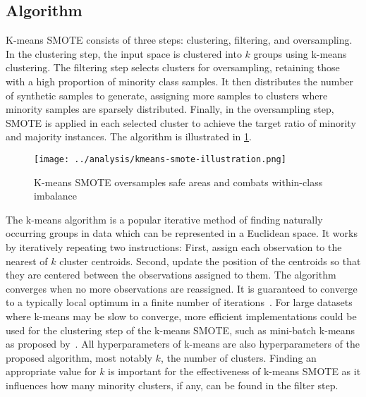 \documentclass[sort&compress]{elsarticle}
\begin{document}
	\subsection{Algorithm}
	K-means \ac{SMOTE} consists of three steps: clustering, filtering, and
	oversampling. In the clustering step, the input space is clustered into $k$
	groups using k-means clustering. The filtering step selects clusters for
	oversampling, retaining those with a high proportion of minority class
	samples. It then distributes the number of synthetic samples to generate,
	assigning more samples to clusters where minority samples are sparsely
	distributed. Finally, in the oversampling step, \ac{SMOTE} is applied in
	each selected cluster to achieve the target ratio of minority and majority
	instances. The algorithm is illustrated in
	\cref{fig:kmeans-smote-illustration}.

    \begin{figure}[ht]
	\centering
	\texttt{[image: ../analysis/kmeans-smote-illustration.png]}
	\caption[K-means \acs{SMOTE} oversamples safe areas and combats within-class imbalance]
	{K-means \ac{SMOTE} oversamples safe areas and combats within-class
	imbalance\protect\footnotemark}
    \label{fig:kmeans-smote-illustration}
	\end{figure}


	The k-means algorithm is a popular iterative method of finding naturally
	occurring groups in data which can be represented in a Euclidean space. It
	works by iteratively repeating two instructions: First, assign each
	observation to the nearest of $k$ cluster centroids. Second, update the
	position of the centroids so that they are centered between the observations
	assigned to them. The algorithm converges when no more observations are
	reassigned. It is guaranteed to converge to a typically local optimum in a
	finite number of iterations~\citep{MacQueen.1967}. For large datasets where
	k-means may be slow to converge, more efficient implementations could be
	used for the clustering step of the k-means \ac{SMOTE}, such as mini-batch
	k-means as proposed by~\citep{Sculley.2010}. All hyperparameters of k-means
	are also hyperparameters of the proposed algorithm, most notably $k$, the
	number of clusters. Finding an appropriate value for $k$ is important for
	the effectiveness of k-means \ac{SMOTE} as it influences how many minority
	clusters, if any, can be found in the filter step.
\end{document}
